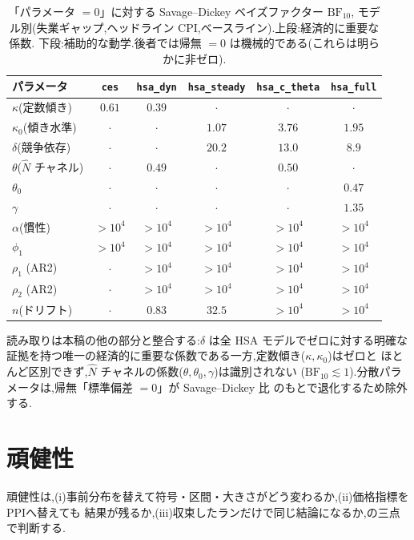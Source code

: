 \documentclass[11pt]{article}
\newcommand{\code}[1]{\texttt{#1}}
\begin{document}
\begin{table}[H]
\centering
\caption{「パラメータ $=0$」に対する Savage--Dickey ベイズファクター $\mathrm{BF}_{10}$,
モデル別(失業ギャップ,ヘッドライン CPI,ベースライン).上段:経済的に重要な係数.
下段:補助的な動学.後者では帰無 $=0$ は機械的である(これらは明らかに非ゼロ).}
\label{tab:sddr}
\begin{tabular}{lccccc}
\toprule
パラメータ & \code{ces} & \code{hsa\_dyn} & \code{hsa\_steady} & \code{hsa\_c\_theta} & \code{hsa\_full} \\
\midrule
$\kappa$(定数傾き)   & $0.61$ & $0.39$ & $\cdot$ & $\cdot$ & $\cdot$ \\
$\kappa_0$(傾き水準)   & $\cdot$ & $\cdot$ & $1.07$ & $3.76$ & $1.95$ \\
$\delta$(競争依存) & $\cdot$ & $\cdot$ & $\mathbf{20.2}$ & $\mathbf{13.0}$ & $\mathbf{8.9}$ \\
$\theta$($\hat N$ チャネル)  & $\cdot$ & $0.49$ & $\cdot$ & $0.50$ & $\cdot$ \\
$\theta_0$                 & $\cdot$ & $\cdot$ & $\cdot$ & $\cdot$ & $0.47$ \\
$\gamma$                   & $\cdot$ & $\cdot$ & $\cdot$ & $\cdot$ & $1.35$ \\
\midrule
$\alpha$(慣性)      & $>10^4$ & $>10^4$ & $>10^4$ & $>10^4$ & $>10^4$ \\
$\phi_1$                   & $>10^4$ & $>10^4$ & $>10^4$ & $>10^4$ & $>10^4$ \\
$\rho_1$ (AR2)             & $\cdot$ & $>10^4$ & $>10^4$ & $>10^4$ & $>10^4$ \\
$\rho_2$ (AR2)             & $\cdot$ & $>10^4$ & $>10^4$ & $>10^4$ & $>10^4$ \\
$n$(ドリフト)                & $\cdot$ & $0.83$ & $32.5$ & $>10^4$ & $>10^4$ \\
\bottomrule
\end{tabular}
\end{table}

\noindent 読み取りは本稿の他の部分と整合する:$\delta$ は全 HSA モデルでゼロに対する明確な
証拠を持つ唯一の経済的に重要な係数である一方,定数傾き($\kappa,\kappa_0$)はゼロと
ほとんど区別できず,$\hat N$ チャネルの係数($\theta,\theta_0,\gamma$)は識別されない
($\mathrm{BF}_{10}\lesssim 1$).分散パラメータは,帰無「標準偏差 $=0$」が Savage--Dickey 比
のもとで退化するため除外する.

\fi
\section{頑健性}
\label{sec:robust}
頑健性は,(i)事前分布を替えて符号・区間・大きさがどう変わるか,(ii)価格指標をPPIへ替えても
結果が残るか,(iii)収束したランだけで同じ結論になるか,の三点で判断する.
\end{document}
